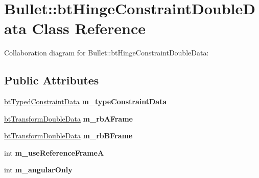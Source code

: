 \hypertarget{class_bullet_1_1bt_hinge_constraint_double_data}{\section{Bullet\+:\+:bt\+Hinge\+Constraint\+Double\+Data Class Reference}
\label{class_bullet_1_1bt_hinge_constraint_double_data}
}


Collaboration diagram for Bullet\+:\+:bt\+Hinge\+Constraint\+Double\+Data\+:
\subsection*{Public Attributes}
\begin{DoxyCompactItemize}
\item 
\hypertarget{class_bullet_1_1bt_hinge_constraint_double_data_aed6fb4b93b1e32d9aea58b28a539cf55}{\hyperlink{class_bullet_1_1bt_typed_constraint_data}{bt\+Typed\+Constraint\+Data} {\bfseries m\+\_\+type\+Constraint\+Data}}\label{class_bullet_1_1bt_hinge_constraint_double_data_aed6fb4b93b1e32d9aea58b28a539cf55}

\item 
\hypertarget{class_bullet_1_1bt_hinge_constraint_double_data_aacdf9312c2d62357c538c55ac7800f0a}{\hyperlink{class_bullet_1_1bt_transform_double_data}{bt\+Transform\+Double\+Data} {\bfseries m\+\_\+rb\+A\+Frame}}\label{class_bullet_1_1bt_hinge_constraint_double_data_aacdf9312c2d62357c538c55ac7800f0a}

\item 
\hypertarget{class_bullet_1_1bt_hinge_constraint_double_data_a0d5da45e386d4a507620ca4b8c0551ba}{\hyperlink{class_bullet_1_1bt_transform_double_data}{bt\+Transform\+Double\+Data} {\bfseries m\+\_\+rb\+B\+Frame}}\label{class_bullet_1_1bt_hinge_constraint_double_data_a0d5da45e386d4a507620ca4b8c0551ba}

\item 
\hypertarget{class_bullet_1_1bt_hinge_constraint_double_data_a59942f717be887606343b6a30847d121}{int {\bfseries m\+\_\+use\+Reference\+Frame\+A}}\label{class_bullet_1_1bt_hinge_constraint_double_data_a59942f717be887606343b6a30847d121}

\item 
\hypertarget{class_bullet_1_1bt_hinge_constraint_double_data_a40ed462dd0abc6e37088eeea35718693}{int {\bfseries m\+\_\+angular\+Only}}\label{class_bullet_1_1bt_hinge_constraint_double_data_a40ed462dd0abc6e37088eeea35718693}


\end{DoxyCompactItemize}
